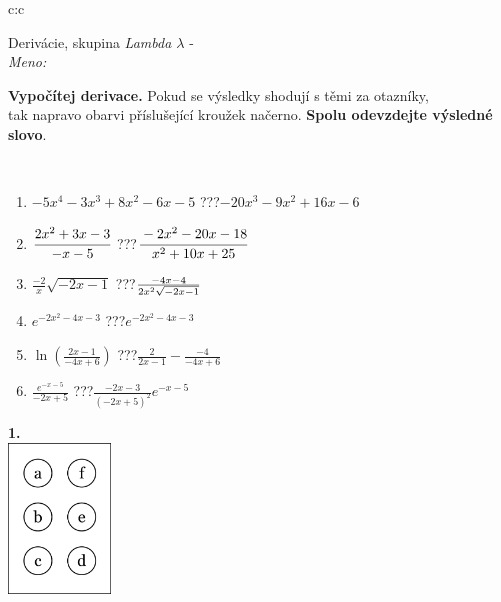 \documentclass[10pt]{report}
\begin{document}
\begin{tabular}{c:c}
\begin{minipage}[c][104.5mm][t]{0.5\linewidth}
\begin{center}
\vspace{7mm}
{\huge Derivácie, skupina \textit{Lambda $\lambda$} -}\\[5mm]
\textit{Meno:}\phantom{xxxxxxxxxxxxxxxxxxxxxxxxxxxxxxxxxxxxxxxxxxxxxxxxxxxxxxxxxxxxxxxxx}\\[5mm]
\begin{minipage}{0.95\linewidth}
\begin{center}
\textbf{Vypočítej derivace.} Pokud se výsledky shodují s těmi za otazníky,\\tak napravo obarvi příslušející kroužek načerno. \textbf{Spolu odevzdejte výsledné slovo}.
\end{center}
\end{minipage}
\\[1mm]
\begin{minipage}{0.79\linewidth}
\begin{center}
\begin{varwidth}{\linewidth}
\begin{enumerate}
\normalsize
\item $-5x^4-3x^3+8x^2-6x-5$\quad \dotfill\; ???\;\dotfill \quad $-20x^3-9x^2+16x-6$
\item $\cfrac{2x^2+3x-3}{-x-5}$\quad \dotfill\; ???\;\dotfill \quad $\cfrac{-2x^2-20x-18}{x^2+10x+25}$
\item $\frac{-2}{x}\sqrt{-2x-1}$\quad \dotfill\; ???\;\dotfill \quad $\frac{-4x-4}{2x^2 \sqrt{\smash[b]{-2x-1}}}$
\item $e^{-2x^2-4x-3}$\quad \dotfill\; ???\;\dotfill \quad $e^{-2x^2-4x-3}$
\item $\ln{\left(\frac{2x-1}{-4x+6}\right)}$\quad \dotfill\; ???\;\dotfill \quad $\frac{2}{2x-1}-\frac{-4}{-4x+6}$
\item $\frac{e^{-x-5}}{-2x+5}$\quad \dotfill\; ???\;\dotfill \quad $\frac{-2x-3}{(-2x+5)^2}e^{-x-5}$
\end{enumerate}
\end{varwidth}
\end{center}
\end{minipage}
\begin{minipage}{0.20\linewidth}
\begin{center}
{\Huge\bfseries 1.} \\[2mm]
\includegraphics[height=40mm]{../images/braille.png}

\end{center}
\end{minipage}
\end{center}
\end{minipage}
\end{tabular}
\end{document}
